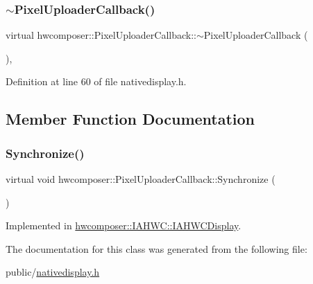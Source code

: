 \subsubsection{\texorpdfstring{$\sim$\+Pixel\+Uploader\+Callback()}{~PixelUploaderCallback()}}
{\footnotesize\ttfamily virtual hwcomposer\+::\+Pixel\+Uploader\+Callback\+::$\sim$\+Pixel\+Uploader\+Callback (\begin{DoxyParamCaption}{ }\end{DoxyParamCaption})\hspace{0.3cm}{\ttfamily [inline]}, {\ttfamily [virtual]}}



Definition at line 60 of file nativedisplay.\+h.


\begin{DoxyCode}{0}
\end{DoxyCode}


\subsection{Member Function Documentation}
\mbox{\label{classhwcomposer_1_1PixelUploaderCallback_aba7239332010fd18deb7152b1c4cecc3}} 
\subsubsection{\texorpdfstring{Synchronize()}{Synchronize()}}
{\footnotesize\ttfamily virtual void hwcomposer\+::\+Pixel\+Uploader\+Callback\+::\+Synchronize (\begin{DoxyParamCaption}{ }\end{DoxyParamCaption})\hspace{0.3cm}{\ttfamily [pure virtual]}}



Implemented in \mbox{\hyperlink{classhwcomposer_1_1IAHWC_1_1IAHWCDisplay_a5911dd47943840836040cdeb9b3ae67b}{hwcomposer\+::\+I\+A\+H\+W\+C\+::\+I\+A\+H\+W\+C\+Display}}.



The documentation for this class was generated from the following file\+:\begin{DoxyCompactItemize}
\item 
public/\mbox{\hyperlink{nativedisplay_8h}{nativedisplay.\+h}}\end{DoxyCompactItemize}
